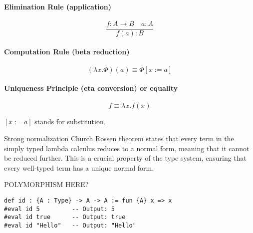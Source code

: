 \paragraph{Elimination Rule (application)}
\[
  \frac{f : A \to B \quad a : A}{f(a) : B}
\]

\paragraph{Computation Rule (beta reduction)}
\[
  (\lambda x. \Phi)(a) \equiv \Phi[x := a]
\]

\paragraph{Uniqueness Principle (eta conversion) or equality}
\[
  f \equiv \lambda x. f(x)
\]
\begin{notation}
    $[x := a]$ stands for substitution.
\end{notation}
Strong normalization Church Rossen theorem states that every term in the simply typed lambda calculus 
reduces to a normal form, meaning that it cannot be reduced further. 
This is a crucial property of the type system, ensuring that every well-typed term has a unique normal form.

POLYMORPHISM HERE?
\begin{example}
    \begin{lstlisting}[language=Lean] 
def id : {A : Type} -> A -> A := fun {A} x => x 
#eval id 5         -- Output: 5
#eval id true      -- Output: true  
#eval id "Hello"   -- Output: "Hello"
\end{lstlisting}
\end{example}
